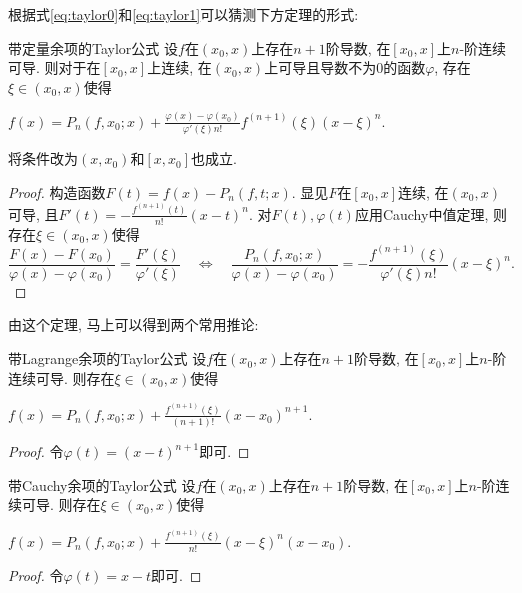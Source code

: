 根据式\ref{eq:taylor0}和\ref{eq:taylor1}可以猜测下方定理的形式: 

\begin{theorem}{带定量余项的Taylor公式}
	设$f$在$(x_0,x)$上存在$n+1$阶导数, 在$[x_0,x]$上$n$-阶连续可导. 则对于在$[x_0,x]$上连续, 在$(x_0,x)$上可导且导数不为$0$的函数$\varphi$, 存在$\xi \in (x_0,x)$使得
	\begin{center}
		$\displaystyle f(x)=P_n(f,x_0;x) + \frac{\varphi (x) - \varphi (x_0)}{\varphi '(\xi) n!} f^{(n+1)}(\xi) (x-\xi )^n. $
	\end{center}
\end{theorem}
\begin{remark}
	将条件改为$(x,x_0)$和$[x,x_0]$也成立. 
\end{remark}
\begin{proof}
	构造函数$F(t)=f(x)-P_n(f,t;x)$. 显见$F$在$[x_0,x]$连续, 在$(x_0,x)$可导, 且$F'(t) = -\frac{f^{(n+1)}(t)}{n!}(x-t)^n$. 对$F(t),\varphi (t)$应用Cauchy中值定理, 则存在$\xi \in (x_0,x)$使得$$\frac{F(x)-F(x_0)}{\varphi (x)-\varphi (x_0)} = \frac{F'(\xi)}{\varphi '(\xi)}\quad \Leftrightarrow \quad \frac{P_n(f,x_0;x)}{\varphi (x)-\varphi (x_0)} = -\frac{f^{(n+1)}(\xi)}{\varphi '(\xi) n!}(x-\xi)^n. $$
\end{proof}

由这个定理, 马上可以得到两个常用推论: 

\begin{corollary}{带Lagrange余项的Taylor公式}
	设$f$在$(x_0,x)$上存在$n+1$阶导数, 在$[x_0,x]$上$n$-阶连续可导. 则存在$\xi \in (x_0,x)$使得
	\begin{center}
		$\displaystyle f(x)=P_n(f,x_0;x)+\frac{f^{(n+1)}(\xi)}{(n+1)!} (x-x_0)^{n+1}. $
	\end{center}
\end{corollary}
\begin{proof}
	令$\varphi (t) = (x-t)^{n+1}$即可. 
\end{proof}

\begin{corollary}{带Cauchy余项的Taylor公式}
	设$f$在$(x_0,x)$上存在$n+1$阶导数, 在$[x_0,x]$上$n$-阶连续可导. 则存在$\xi \in (x_0,x)$使得
	\begin{center}
		$\displaystyle f(x)=P_n(f,x_0;x)+\frac{f^{(n+1)}(\xi)}{n!} (x-\xi)^n(x-x_0). $
	\end{center}
\end{corollary}
\begin{proof}
	令$\varphi (t) = x-t$即可. 
\end{proof}

